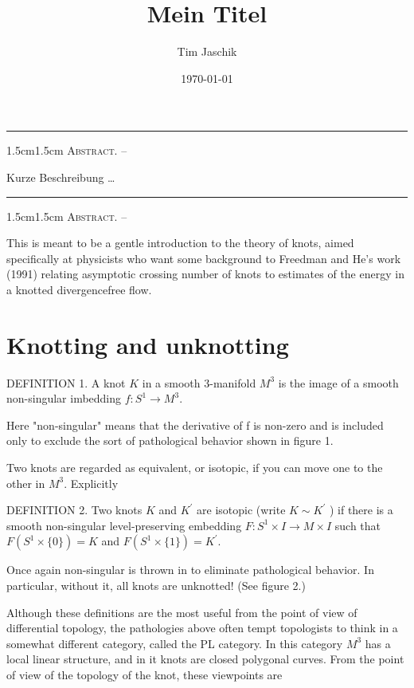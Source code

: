 \documentclass[10pt, letterpaper]{article}
\title{Mein Titel}
\author{Tim Jaschik}
\date{\today}
\renewenvironment{abstract}
  {
    \begin{adjustwidth}{1.5cm}{1.5cm}
    \small
    \textsc{Abstract. –}%
  }
  {
    \end{adjustwidth}
  }
\begin{document}
\maketitle
\rule{\textwidth}{0.5pt}
\begin{abstract}
Kurze Beschreibung …
\end{abstract}
\rule{\textwidth}{0.5pt}
\vspace{0.5cm}

\tableofcontents

\pagebreak


\begin{abstract}
This is meant to be a gentle introduction to the theory of knots, aimed specifically at physicists who want some background to Freedman and He's work (1991) relating asymptotic crossing number of knots to estimates of the energy in a knotted divergencefree flow.
\end{abstract}


\section{Knotting and unknotting}
DEFINITION 1. A knot $K$ in a smooth 3-manifold $M^{3}$ is the image of a smooth non-singular imbedding $f: S^{1} \rightarrow M^{3}$.

Here "non-singular" means that the derivative of f is non-zero and is included only to exclude the sort of pathological behavior shown in figure 1.

Two knots are regarded as equivalent, or isotopic, if you can move one to the other in $M^{3}$. Explicitly

DEFINITION 2. Two knots $K$ and $K^{\prime}$ are isotopic (write $K \sim K^{\prime}$ ) if there is a smooth non-singular level-preserving embedding $F: S^{1} \times I \rightarrow M \times I$ such that $F\left(S^{1} \times\{0\}\right)=K$ and $F\left(S^{1} \times\{1\}\right)=K^{\prime}$.

Once again non-singular is thrown in to eliminate pathological behavior. In particular, without it, all knots are unknotted! (See figure 2.)

Although these definitions are the most useful from the point of view of differential topology, the pathologies above often tempt topologists to think in a somewhat different category, called the PL category. In this category $M^{3}$ has a local linear structure, and in it knots are closed polygonal curves. From the point of view of the topology of the knot, these viewpoints are
\end{document}

